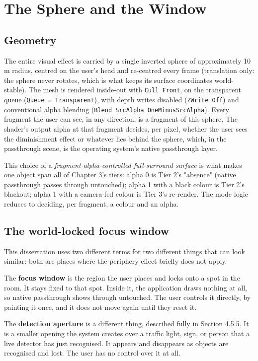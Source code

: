 \section{The Sphere and the Window}

\subsection{Geometry}

The entire visual effect is carried by a single inverted sphere of approximately 10 m radius,
centred on the user's head and re-centred every frame (translation only: the sphere never rotates,
which is what keeps its surface coordinates world-stable). The mesh is rendered inside-out with
\verb|Cull Front|, on the transparent queue (\verb|Queue = Transparent|), with depth writes disabled
(\verb|ZWrite Off|) and conventional alpha blending (\verb|Blend SrcAlpha OneMinusSrcAlpha|). Every fragment
the user can see, in any direction, is a fragment of this sphere. The shader's output alpha at that
fragment decides, per pixel, whether the user sees the diminishment effect or whatever lies behind
the sphere, which, in the passthrough scene, is the operating system's native passthrough layer.

This choice of a \textit{fragment-alpha-controlled full-surround surface} is what makes one object span all
of Chapter 3's tiers: alpha 0 is Tier 2's "absence" (native passthrough passes through untouched);
alpha 1 with a black colour is Tier 2's blackout; alpha 1 with a camera-fed colour is Tier 3's
re-render. The mode logic reduces to deciding, per fragment, a colour and an alpha.

\subsection{The world-locked focus window}

This dissertation uses two different terms for two different things that can look similar: both are
places where the periphery effect briefly does not apply.

The \textbf{focus window} is the region the user places and locks onto a spot in the room. It stays
fixed to that spot. Inside it, the application draws nothing at all, so native passthrough shows
through untouched. The user controls it directly, by painting it once, and it does not move again
until they reset it.

The \textbf{detection aperture} is a different thing, described fully in Section 4.5.5. It is a
smaller opening the system creates over a traffic light, sign, or person that a live detector has
just recognised. It appears and disappears as objects are recognised and lost. The user has no
control over it at all.

